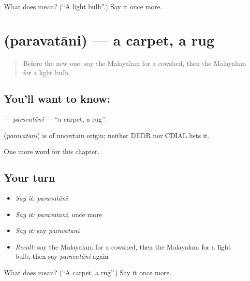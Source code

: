 \begin{tcolorbox}[breakable,colback=teal!4,colframe=teal!35!black,title={Before you move on}]
What does  mean? (\textquotedblleft{}A light bulb\textquotedblright{}.) Say it once more.
\end{tcolorbox}
\section[\texorpdfstring{\ml{പരവതാനി} (paravatāni)}{പരവതാനി (paravatāni)}]{ (paravatāni) — a carpet, a rug}

\label{lesson:ML-C296-paravatani}



\begin{quote}
Before the new one: say the Malayalam for a cowshed, then the Malayalam for a light bulb.
\end{quote}

\subsection*{You'll want to know: }
\textbf{} — \emph{paravatāni} — \textquotedblleft{}a carpet, a rug\textquotedblright{}.

\begin{cousinweb}
\textbf{} (\emph{paravatāni}) is of uncertain origin; neither DEDR nor CDIAL lists it.
\end{cousinweb}

\begin{grammarlens}[title={What you've built}]
One more word for this chapter.
\end{grammarlens}

\subsection*{Your turn}
\begin{itemize}
\raggedright
  \item \emph{Say it:} \emph{paravatāni}
  \item \emph{Say it:} \emph{paravatāni}, once more
  \item \emph{Say it:} say \emph{paravatāni}
  \item \emph{Recall:} say the Malayalam for a cowshed, then the Malayalam for a light bulb, then say \emph{paravatāni} again
\end{itemize}

\begin{tcolorbox}[breakable,colback=teal!4,colframe=teal!35!black,title={Before you move on}]
What does  mean? (\textquotedblleft{}A carpet, a rug\textquotedblright{}.) Say it once more.
\end{tcolorbox}

